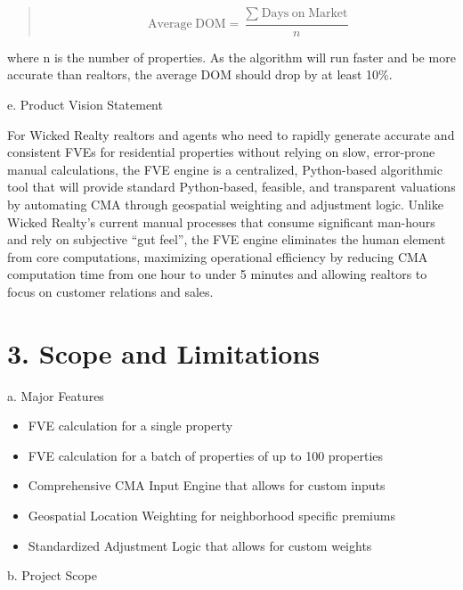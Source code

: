 \documentclass[
]{article}
\begin{document}
\begin{quote}
\[\text{Average}\text{ }\text{DOM} = \frac{\sum_{\text{ }}^{\text{ }}\text{Days}\text{ }\text{on}\text{ }\text{Market}}{n}\]
\end{quote}

where n is the number of properties. As the algorithm will run faster
and be more accurate than realtors, the average DOM should drop by at
least 10\%.

e. Product Vision Statement

For Wicked Realty realtors and agents who need to rapidly generate
accurate and consistent FVEs for residential properties without relying
on slow, error-prone manual calculations, the FVE engine is a
centralized, Python-based algorithmic tool that will provide standard
Python-based, feasible, and transparent valuations by automating CMA
through geospatial weighting and adjustment logic. Unlike Wicked
Realty's current manual processes that consume significant man-hours and
rely on subjective ``gut feel'', the FVE engine eliminates the human
element from core computations, maximizing operational efficiency by
reducing CMA computation time from one hour to under 5 minutes and
allowing realtors to focus on customer relations and sales.

 {}\section{3. Scope and Limitations}\label{scope-and-limitations}

a. Major Features

\begin{itemize}
\item
  FVE calculation for a single property
\item
  FVE calculation for a batch of properties of up to 100 properties
\item
  Comprehensive CMA Input Engine that allows for custom inputs
\item
  Geospatial Location Weighting for neighborhood specific premiums
\item
  Standardized Adjustment Logic that allows for custom weights
\end{itemize}

b. Project Scope
\end{document}
